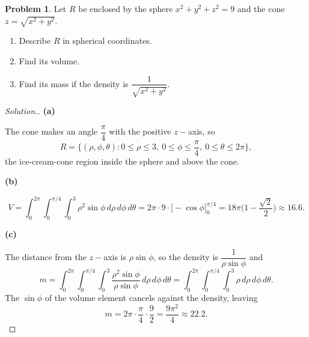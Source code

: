 \documentclass[11pt,a4paper]{article}
\theoremstyle{definition}
\newtheorem{problemx}{Problem}[subsection]
\newenvironment{problem}{\begin{problemx}}{\end{problemx}}
\newenvironment{solution}
  {\renewcommand{\qedsymbol}{}\begin{proof}[\textit{Solution}.]}
  {\end{proof}}
\newcommand{\subhead}[1]{%
  \par\medskip\noindent\textbf{#1}\par\nobreak\smallskip}
\begin{document}
\begin{problem}
Let $R$ be enclosed by the sphere $x^2+y^2+z^2 = 9$ and the cone
$z = \sqrt{x^2+y^2}$.
\begin{enumerate}
\item[(a)] Describe $R$ in spherical coordinates.
\item[(b)] Find its volume.
\item[(c)] Find its mass if the density is
$\dfrac{1}{\sqrt{x^2+y^2}}$.
\end{enumerate}
\end{problem}
\begin{solution}
\subhead{(a)}
The cone makes an angle $\dfrac{\pi}{4}$ with the positive $z-$axis, so
$$R = \Big\{(\rho,\phi,\theta): 0\leq\rho\leq 3,\ 0\leq\phi\leq\frac{\pi}{4},\
0\leq\theta\leq 2\pi\Big\},$$
the ice-cream-cone region inside the sphere and above the cone.

\subhead{(b)}
$$V = \int_0^{2\pi}\int_0^{\pi/4}\int_0^3\rho^2\sin\phi\,d\rho\,d\phi\,d\theta
= 2\pi\cdot 9\cdot\Big[-\cos\phi\Big]_0^{\pi/4}
= 18\pi\Big(1-\frac{\sqrt2}{2}\Big)\approx 16.6 .$$

\subhead{(c)}
The distance from the $z-$axis is $\rho\sin\phi$, so the density is
$\dfrac{1}{\rho\sin\phi}$ and
$$m = \int_0^{2\pi}\int_0^{\pi/4}\int_0^3
\frac{\rho^2\sin\phi}{\rho\sin\phi}\,d\rho\,d\phi\,d\theta
= \int_0^{2\pi}\int_0^{\pi/4}\int_0^3\rho\,d\rho\,d\phi\,d\theta .$$
The $\sin\phi$ of the volume element cancels against the density, leaving
$$m = 2\pi\cdot\frac{\pi}{4}\cdot\frac92 = \frac{9\pi^2}{4}\approx 22.2 .$$
\end{solution}
\end{document}

